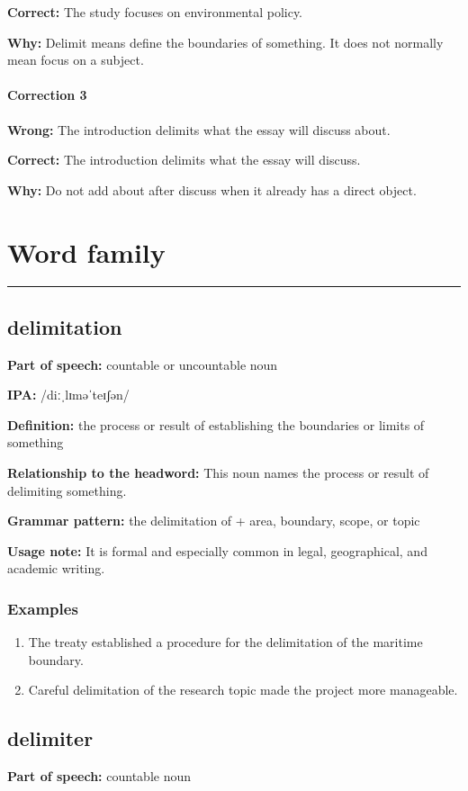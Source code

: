 \documentclass[11pt]{article}
\newcommand{\sectionrule}{\par\vspace{-0.5em}\noindent\textcolor{Accent}{\rule{\linewidth}{0.6pt}}\par}
\begin{document}
\textbf{Correct:} The study focuses on environmental policy.

\textbf{Why:} Delimit means define the boundaries of something. It does not normally mean focus on a subject.

\paragraph{Correction 3}
\textbf{Wrong:} The introduction delimits what the essay will discuss about.

\textbf{Correct:} The introduction delimits what the essay will discuss.

\textbf{Why:} Do not add about after discuss when it already has a direct object.

\section{Word family}
\sectionrule
\subsection{delimitation}
\textbf{Part of speech:} countable or uncountable noun

\textbf{IPA:} /diːˌlɪməˈteɪʃən/

\textbf{Definition:} the process or result of establishing the boundaries or limits of something

\textbf{Relationship to the headword:} This noun names the process or result of delimiting something.

\textbf{Grammar pattern:} the delimitation of + area, boundary, scope, or topic

\textbf{Usage note:} It is formal and especially common in legal, geographical, and academic writing.

\subsubsection{Examples}
\begin{enumerate}
  \item The treaty established a procedure for the delimitation of the maritime boundary.
  \item Careful delimitation of the research topic made the project more manageable.
\end{enumerate}

\subsection{delimiter}
\textbf{Part of speech:} countable noun
\end{document}
